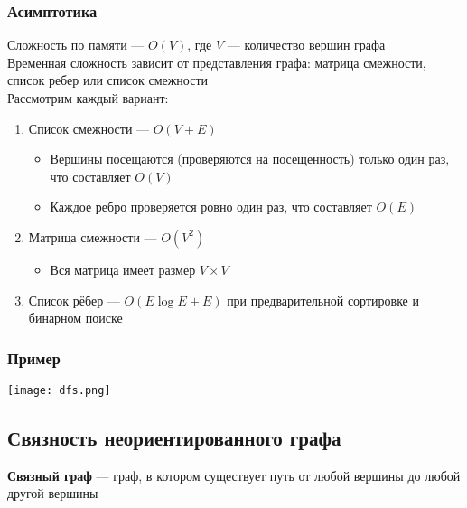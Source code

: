 \documentclass[a4paper]{article}
\begin{document}
\subsubsection*{Асимптотика}
\label{dfs_asimp}
Сложность по памяти — $O(V)$, где $V$ — количество вершин графа\\[2mm]
Временная сложность зависит от представления графа: матрица смежности, список ребер или список смежности\\[2mm]
\indent Рассмотрим каждый вариант:
\begin{enumerate}
    \item Список смежности — $O(V+E)$
    \begin{itemize}
        \item Вершины посещаются (проверяются на посещенность) только один раз, что составляет $O(V)$
        \item Каждое ребро проверяется ровно один раз, что составляет $O(E)$
    \end{itemize}
    \item Матрица смежности — $O(V^2)$
    \begin{itemize}
        \item Вся матрица имеет размер $V\times V$
    \end{itemize}
    \item Список рёбер — $O(E\log E + E)$ при предварительной сортировке и бинарном поиске
\end{enumerate}
\subsubsection*{Пример}
\begin{center}
    \texttt{[image: dfs.png]}
    \label{dfs}
\end{center}

\subsection{Связность неориентированного графа}
\textbf{Связный граф} — граф, в котором существует путь от любой вершины до любой другой вершины
\end{document}
